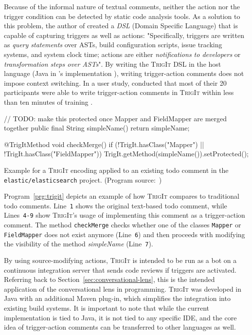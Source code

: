Because of the informal nature of textual comments, neither the action nor the trigger condition can be detected by static code analysis tools.
As a solution to this problem, the author of \cite{nie_framework_2019} created a \emph{DSL} (Domain Specific Language) that is capable of capturing triggers as well as actions: "Specifically, triggers are written as \emph{query statements} over ASTs, build configuration scripts, issue tracking systems, and system clock time; actions are either \emph{notifications to developers} or \emph{transformation steps over ASTs}". \cite{nie_framework_2019}
By writing the \textsc{TrigIt DSL} in the host language (Java in \citeauthor{nie_framework_2019}'s implementation \cite{nie_framework_2019}), writing trigger-action comments does not impose context switching.
In a user study, \citeauthor{nie_framework_2019} conducted that most of their 20 participants were able to write trigger-action comments in \textsc{TrigIt} within less than ten minutes of training \cite{nie_framework_2019}.
%
\begin{program}[ht]
\begin{JavaCode}
// TODO: make this protected once Mapper and FieldMapper are merged together
public final String simpleName() { return simpleName; }

@TrigItMethod
void checkMerge() {
    if (!TrigIt.hasClass("Mapper") || !TrigIt.hasClass("FieldMapper")) {
        TrigIt.getMethod(simpleName()).setProtected();
    }
}
\end{JavaCode}
\caption{Example for a \textsc{TrigIt} encoding applied to an existing todo comment in the \texttt{elastic/elasticsearch} project. (Program source:~\cite{nie_framework_2019})}
\label{prg:trigit}
\end{program}
%
Program~\ref{prg:trigit} depicts an example of how \textsc{TrigIt} compares to traditional todo comments.
Line~\verb|1| shows the original text-based todo comment, while Lines~\verb|4-9| show \textsc{TrigIt}'s usage of implementing this comment as a trigger-action comment.
The method \texttt{checkMerge} checks whether one of the classes \texttt{Mapper} or \texttt{FieldMapper} does not exist anymore (Line~\verb|6|) and then proceeds with modifying the visibility of the method \emph{simpleName} (Line~\verb|7|).

By using source-modifying actions, \textsc{TrigIt} is intended to be run as a bot on a continuous integration server that sends code reviews if triggers are activated.
Referring back to Section~\ref{sec:conversational-lens}, this is the intended application of the conversational lens in programming.
\textsc{TrigIt} was developed in Java with an additional Maven plug-in, which simplifies the integration into existing build systems.
It is important to note that while the current implementation is tied to Java, it is not tied to any specific IDE, and the core idea of trigger-action comments can be transferred to other languages as well.

